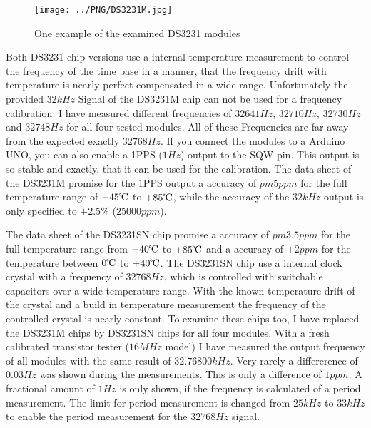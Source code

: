 \begin{figure}[H]
\centering
\texttt{[image: ../PNG/DS3231M.jpg]}
\caption{One example of the examined DS3231 modules}
\label{fig:DS3231M}
\end{figure}

Both DS3231 chip versions use a internal temperature measurement to control the frequency of
the time base in a manner, that the frequency drift with temperature is nearly
perfect compensated in a wide range.
Unfortunately the provided \(32kHz\) Signal of the DS3231M chip can not be used for a
frequency calibration. I have measured different frequencies of \(32641Hz\), \(32710Hz\),
\(32730Hz\) and \(32748Hz\) for all four tested modules. 
All of these Frequencies are far away from the expected exactly \(32768Hz\).
If you connect the modules to a Arduino UNO, you can also enable a 1PPS (\(1Hz\)) output
to the SQW pin.
This output is so stable and exactly, that it can be used for the calibration.
The data sheet of the DS3231M promise for the 1PPS output a accuracy of \(pm 5ppm\) for
the full temperature range of \(-45\celsius\) to \(+85\celsius\), while the accuracy of the
\(32kHz\) output is only specified to \(\pm 2.5\%\) (\(25000ppm\)).

The data sheet of the DS3231SN chip promise a accuracy of \(pm 3.5ppm\) for the full
temperature range from \(-40\celsius\) to \(+85\celsius\) and a accuracy of \(\pm 2ppm\)
for the temperature between \(0\celsius\) to \(+40\celsius\).
The DS3231SN chip use a internal clock crystal with a frequency of \(32768Hz\), which is
controlled with switchable capacitors over a wide temperature range.
With the known temperature drift of the crystal and a build in temperature measurement
the frequency of the controlled crystal is nearly constant.
To examine these chips too, I have replaced the DS3231M chips by DS3231SN chips for
all four modules.
With a fresh calibrated transistor tester (\(16MHz\) model) I have measured the output frequency of all
modules with the same result of \(32.76800kHz\). Very rarely a differerence of \(0.03Hz\)
was shown during the measurements. This is only a difference of \(1ppm\).
A fractional amount of \(1Hz\) is only shown, if the frequency is calculated of a period measurement.
The limit for period measurement is changed from \(25kHz\) to \(33kHz\) to enable
the period measurement for the \(32768Hz\) signal.


